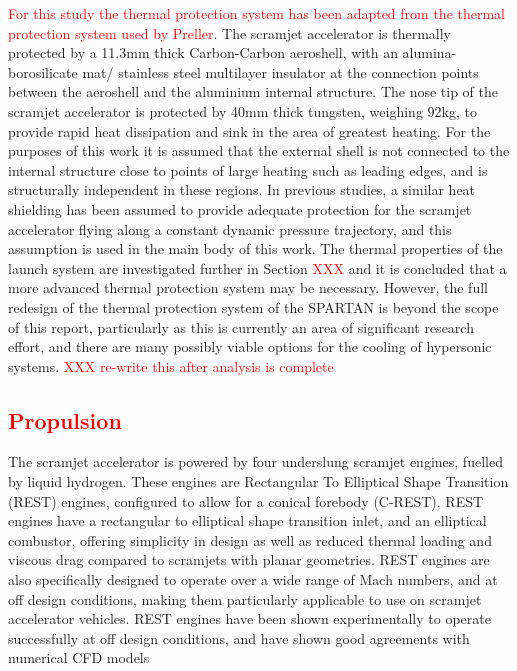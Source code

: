 \textcolor{red}{For this study the thermal protection system has been adapted from the thermal protection system used by Preller\cite{Preller2018a}}. The scramjet accelerator is thermally protected by a 11.3mm thick Carbon-Carbon aeroshell, with an alumina-borosilicate mat/ stainless steel multilayer insulator at the connection points between the aeroshell and the aluminium internal structure\cite{Preller2018a}. The nose tip of the scramjet accelerator is protected by 40mm thick tungsten, weighing 92kg, to provide rapid heat dissipation and sink in the area of greatest heating. For the purposes of this work it is assumed that the external shell is not connected to the internal structure close to points of large heating such as leading edges, and is structurally independent in these regions. 
In previous studies, a similar heat shielding has been assumed to provide adequate protection for the scramjet accelerator flying along a constant dynamic pressure trajectory\cite{Preller2018a}, and this assumption is used in the main body of this work. The thermal properties of the launch system are investigated further in Section \textcolor{red}{XXX} and it is concluded that a more advanced thermal protection system may be necessary. However, the full redesign of the thermal protection system of the SPARTAN is beyond the scope of this report, particularly as this is currently an area of significant research effort, and there are many possibly viable options for the cooling of hypersonic systems. 
\textcolor{red}{XXX re-write this after analysis is complete}

\textcolor{red}{
\subsection{Propulsion}\label{sec:propulsion}
}
The scramjet accelerator is powered by four underslung scramjet engines, fuelled by liquid hydrogen. These engines are Rectangular To Elliptical Shape Transition (REST) engines, configured to allow for a conical forebody (C-REST). REST engines have a rectangular to elliptical shape transition inlet, and an elliptical combustor, offering simplicity in design as well as reduced thermal loading and viscous drag compared to scramjets with planar geometries\cite{Suraweera2009}.  REST engines are also specifically designed to operate over a wide range of Mach numbers, and at off design conditions, making them particularly applicable to use on scramjet accelerator vehicles. REST engines have been shown experimentally to operate successfully at off design conditions\cite{Smart2006,Smart2009a}, and have shown good agreements with numerical CFD models\cite{Smart2009a}


